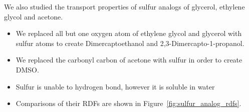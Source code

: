 \documentclass{article}
\begin{document}
  We also studied the transport properties of sulfur analogs of glycerol, ethylene
  glycol and acetone.
  \begin{itemize}
    \item We replaced all but one oxygen atom of ethylene glycol and glycerol with sulfur atoms
    to create Dimercaptoethanol and 2,3-Dimercapto-1-propanol.
    \item We replaced the carbonyl carbon of acetone with sulfur in order to create DMSO. 
  	\item Sulfur is unable to hydrogen bond, however it is soluble in water  %
  	\item Comparisons of their RDFs are shown in Figure~\ref{fig:sulfur_analog_rdfs}.
  \end{itemize}
  
\end{document}
